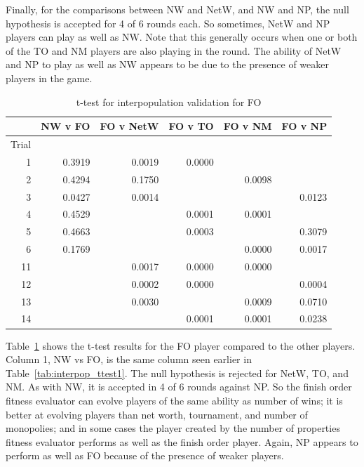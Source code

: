 Finally, for the comparisons between NW and NetW, and NW and NP, the null
hypothesis is accepted for 4 of 6 rounds each. So sometimes, NetW and NP players
can play as well as NW. Note that this generally occurs when one or both of the
TO and NM players are also playing in the round. The ability of NetW and NP to
play as well as NW appears to be due to the presence of weaker players in the
game.

\begin{table}[htbp]
  \centering
  \caption{t-test for interpopulation validation for FO}
    \begin{tabular}{rrrrrr}
    \toprule
          & NW v FO & FO v NetW & FO v TO & FO v NM & FO v NP \\
    \midrule
    Trial &        &        &        &        &        \\
    1     & 0.3919 & 0.0019 & 0.0000 &        &        \\
    2     & 0.4294 & 0.1750 &        & 0.0098 &        \\
    3     & 0.0427 & 0.0014 &        &        & 0.0123 \\
    4     & 0.4529 &        & 0.0001 & 0.0001 &        \\
    5     & 0.4663 &        & 0.0003 &        & 0.3079 \\
    6     & 0.1769 &        &        & 0.0000 & 0.0017 \\
    11    &        & 0.0017 & 0.0000 & 0.0000 &        \\
    12    &        & 0.0002 & 0.0000 &        & 0.0004 \\
    13    &        & 0.0030 &        & 0.0009 & 0.0710 \\
    14    &        &        & 0.0001 & 0.0001 & 0.0238 \\
    \bottomrule
    \end{tabular}%
  \label{tab:interpop_ttest2}%
\end{table}%

Table~\ref{tab:interpop_ttest2} shows the t-test results for the FO player
compared to the other players. Column 1, NW vs FO, is the same column seen
earlier in Table~\ref{tab:interpop_ttest1}. The null hypothesis is rejected for
NetW, TO, and NM. As with NW, it is accepted in 4 of 6 rounds against NP. So the
finish order fitness evaluator can evolve players of the same ability as number
of wins; it is better at evolving players than net worth, tournament, and number
of monopolies; and in some cases the player created by the number of properties
fitness evaluator performs as well as the finish order player. Again, NP appears
to perform as well as FO because of the presence of weaker players.

